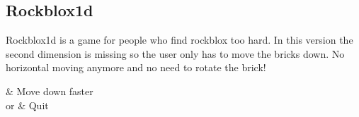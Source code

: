 \subsection{Rockblox1d}

Rockblox1d is a game for people who find rockblox too hard. In this version the
second dimension is missing so the user only has to move the bricks down. No 
horizontal moving anymore and no need to rotate the brick!

\begin{btnmap}
      \PluginDown
        & Move down faster\\

      \PluginCancel{} or \PluginExit
        & Quit\\
\end{btnmap}
